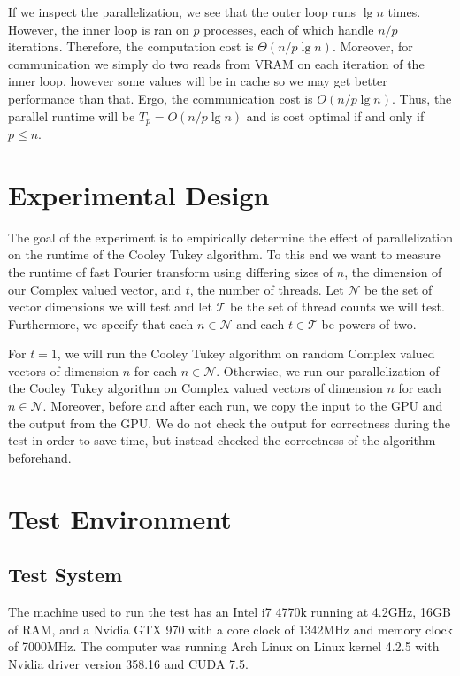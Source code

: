 \documentclass[notitlepage, twocolumn]{article}
\begin{document}
If we inspect the parallelization, we see that the outer loop runs $\lg n$ times.
However, the inner loop is ran on $p$ processes, each of which handle $n/p$ iterations.
Therefore, the computation cost is $\Theta(n/p\lg n)$.
Moreover, for communication we simply do two reads from VRAM on each iteration of the inner loop, however some values will be in cache so we may get better performance than that.
Ergo, the communication cost is $O(n/p\lg n)$.
Thus, the parallel runtime will be $T_p = O(n/p \lg n)$ and is cost optimal if and only if $p\leq n$.

\section{Experimental Design}

The goal of the experiment is to empirically determine the effect of parallelization on the runtime of the Cooley Tukey algorithm.
To this end we want to measure the runtime of fast Fourier transform using differing sizes of $n$, the dimension of our Complex valued vector, and $t$, the number of threads.
Let $\mathcal{N}$ be the set of vector dimensions we will test and let $\mathcal{T}$ be the set of thread counts we will test.
Furthermore, we specify that each $n\in\mathcal{N}$ and each $t\in\mathcal{T}$ be powers of two.

For $t=1$, we will run the Cooley Tukey algorithm on random Complex valued vectors of dimension $n$ for each $n\in\mathcal{N}$.
Otherwise, we run our parallelization of the Cooley Tukey algorithm on Complex valued vectors of dimension $n$ for each $n\in\mathcal{N}$.
Moreover, before and after each run, we copy the input to the GPU and the output from the GPU.
We do not check the output for correctness during the test in order to save time, but instead checked the correctness of the algorithm beforehand.

\section{Test Environment}

\subsection{Test System}

The machine used to run the test has an Intel i7 4770k running at 4.2GHz, 16GB of RAM, and a Nvidia GTX 970 with a core clock of 1342MHz and memory clock of 7000MHz.
The computer was running Arch Linux on Linux kernel 4.2.5 with Nvidia driver version 358.16 and CUDA 7.5.
\end{document}
